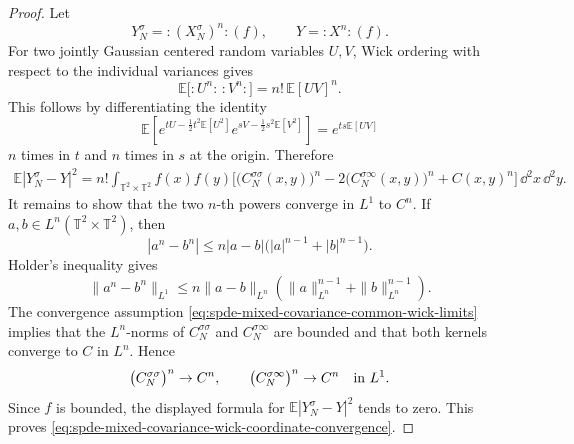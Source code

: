\begin{proof}
Let
\[
  Y_N^\sigma=:\!(X_N^\sigma)^n\!:(f),
  \qquad
  Y=:\!X^n\!:(f).
\]
For two jointly Gaussian centered random variables \(U,V\), Wick ordering
with respect to the individual variances gives
\[
  \mathbb E\bigl[:\!U^n\!:\,:\!V^n\!:\bigr]
  =
  n!\,\mathbb E[UV]^n .
\]
This follows by differentiating the identity
\[
  \mathbb E\!\left[
    e^{tU-\frac12t^2\mathbb E[U^2]}
    e^{sV-\frac12s^2\mathbb E[V^2]}
  \right]
  =
  e^{ts\mathbb E[UV]}
\]
\(n\) times in \(t\) and \(n\) times in \(s\) at the origin.  Therefore
\[
\begin{aligned}
  \mathbb E|Y_N^\sigma-Y|^2
  =
  n!\int_{\mathbb T^2\times\mathbb T^2}
  f(x)f(y)
  \Big[
    \big(C_N^{\sigma\sigma}(x,y)\big)^n
    -2\big(C_N^{\sigma\infty}(x,y)\big)^n
    +C(x,y)^n
  \Big]\,\dd^2x\,\dd^2y .
\end{aligned}
\]
It remains to show that the two \(n\)-th powers converge in \(L^1\) to
\(C^n\).  If \(a,b\in L^n(\mathbb T^2\times\mathbb T^2)\), then
\[
  |a^n-b^n|
  \leq
  n|a-b|\bigl(|a|^{n-1}+|b|^{n-1}\bigr).
\]
Holder's inequality gives
\[
  \|a^n-b^n\|_{L^1}
  \leq
  n\|a-b\|_{L^n}
  \left(
    \|a\|_{L^n}^{n-1}+\|b\|_{L^n}^{n-1}
  \right).
\]
The convergence assumption
\eqref{eq:spde-mixed-covariance-common-wick-limits} implies that the
\(L^n\)-norms of \(C_N^{\sigma\sigma}\) and
\(C_N^{\sigma\infty}\) are bounded and that both kernels converge to \(C\)
in \(L^n\).  Hence
\[
  \big(C_N^{\sigma\sigma}\big)^n\to C^n,
  \qquad
  \big(C_N^{\sigma\infty}\big)^n\to C^n
  \quad\hbox{in }L^1.
\]
Since \(f\) is bounded, the displayed formula for
\(\mathbb E|Y_N^\sigma-Y|^2\) tends to zero.  This proves
\eqref{eq:spde-mixed-covariance-wick-coordinate-convergence}.
\end{proof}

